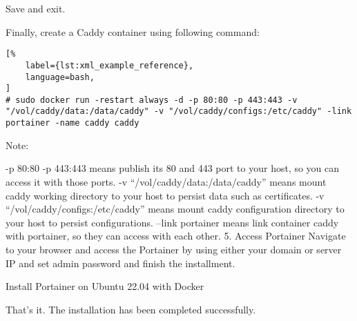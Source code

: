 \documentclass[%
	a4paper,
	oneside,
	listof=numbered,
	parskip=half,
	headsepline=true,
	footsepline=false,
	0.7headlines,
	]{scrbook}
\begin{document}
Save and exit.

Finally, create a Caddy container using following command:

\begin{lstlisting}[%
	label={lst:xml_example_reference},
	language=bash,
]
# sudo docker run -restart always -d -p 80:80 -p 443:443 -v "/vol/caddy/data:/data/caddy" -v "/vol/caddy/configs:/etc/caddy" -link portainer -name caddy caddy
\end{lstlisting}

Note:

-p 80:80 -p 443:443 means publish its 80 and 443 port to your host, so you can access it with those ports.
-v “/vol/caddy/data:/data/caddy” means mount caddy working directory to your host to persist data such as certificates.
-v “/vol/caddy/configs:/etc/caddy” means mount caddy configuration directory to your host to persist configurations.
–link portainer means link container caddy with portainer, so they can access with each other.
5.
Access Portainer
Navigate to your browser and access the Portainer by using either your domain or server IP and set admin password and finish the installment.



Install Portainer on Ubuntu 22.04 with Docker

That’s it.
The installation has been completed successfully.

\listoffigures
\lstlistoflistings

%
%
\end{document}
